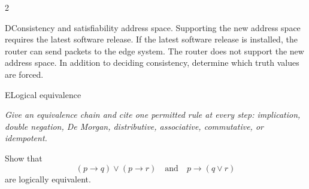 \documentclass[9pt]{extarticle}
\begin{document}
\begin{multicols}{2}
\begin{CoreProblem}{D}{Consistency and satisfiability}
address space. Supporting the new address space requires the latest software
release. If the latest software release is installed, the router can send
packets to the edge system. The router does not support the new address space.
In addition to deciding consistency, determine which truth values are forced.
\end{CoreProblem}
\begin{CoreProblem}{E}{Logical equivalence}
{\scriptsize\textit{Give an equivalence chain and cite one permitted rule at every step: implication, double negation, De Morgan, distributive, associative, commutative, or idempotent.}\par}
Show that
\[
  (p\to q)\lor(p\to r)
  \quad\text{and}\quad
  p\to(q\lor r)
\]
are logically equivalent.
\end{CoreProblem}
\end{multicols}
\CoreWorkArea
\FormBreak
{}
\end{document}
